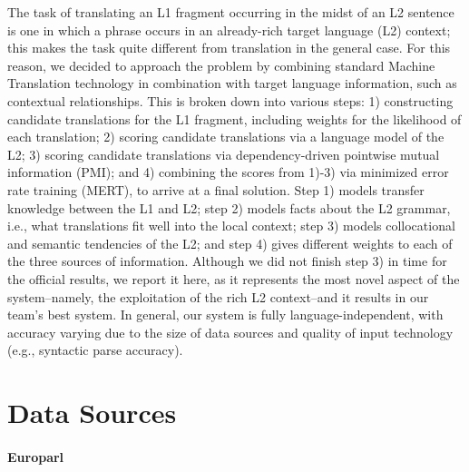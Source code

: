 \documentclass[11pt]{article}
\begin{document}
The task of translating an L1 fragment occurring in the midst of an L2 sentence is one in which a phrase occurs in an already-rich target language (L2) context; this makes the task quite different from translation in the general case. For this reason, we decided to approach the problem by combining standard Machine Translation technology in combination with target language information,
such as contextual relationships. 
This is broken down into various steps: 1) constructing candidate translations for the L1 fragment, including weights for the likelihood of each translation; 2) scoring candidate translations via a language model of the L2; 3) scoring candidate translations via dependency-driven pointwise mutual information (PMI); and 4) combining the scores from 1)-3) via minimized error rate training (MERT), to arrive at a final solution.  Step 1) models transfer knowledge between the L1 and L2; step 2) models facts about the L2 grammar, i.e., what translations fit well into the local context; step 3) models collocational and semantic tendencies of the L2; and step 4)  gives different weights to each of the three sources of information.  Although we did not finish step 3) in time for the official results, we report it here, as it represents the most novel aspect of the system--namely, the exploitation of the rich L2 context--and it results in our team's best system.  In general, our system is fully language-independent, with accuracy varying due to the size of data sources and quality of input technology (e.g., syntactic parse accuracy).

\section{Data Sources}


\paragraph{Europarl}  %
\end{document}
